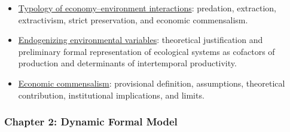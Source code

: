 \begin{itemize}
\begin{itemize}
        \item[iii.] \underline{Typology of economy--environment interactions}: predation, extraction, extractivism, strict preservation, and economic commensalism.

        \item[iv.] \underline{Endogenizing environmental variables}: theoretical justification and preliminary formal representation of ecological systems as cofactors of production and determinants of intertemporal productivity.

        \item[v.] \underline{Economic commensalism}: provisional definition, assumptions, theoretical contribution, institutional implications, and limits.

    \end{itemize}

\end{itemize}

\subsubsection{Chapter 2: Dynamic Formal Model}

